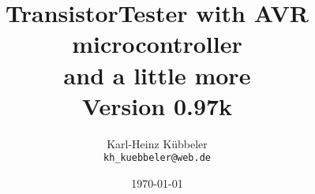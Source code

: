 \documentclass[12pt,a4paper,oneside,english]{report}
\begin{document}
\title{TransistorTester with AVR microcontroller \\
and a little more\\
Version 0.97k \\
}
\author{Karl-Heinz K\"ubbeler\\
\texttt{kh\_kuebbeler@web.de}}
\date{\today}
\maketitle
\tableofcontents











 
 
 
 




\end{document}
